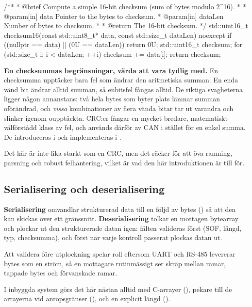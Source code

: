 \begin{cppcode}
/**
 * @brief Compute a simple 16-bit checksum (sum of bytes modulo 2^16).
 *
 * @param[in] data Pointer to the bytes to checksum.
 * @param[in] dataLen Number of bytes to checksum.
 *
 * @return The 16-bit checksum.
 */
std::uint16_t checksum16(const std::uint8_t* data, const std::size_t dataLen) noexcept
{
    if ((nullptr == data) || (0U == dataLen)) { return 0U; }
    std::uint16_t checksum{};
    for (std::size_t i{}; i < dataLen; ++i) { checksum += data[i]; }
    return checksum;
}
\end{cppcode}

\begin{warning}
\textbf{En checksummas begränsningar, värda att vara tydlig med.} En checksumma upptäcker bara fel
som ändrar den aritmetiska summan. En enda vänd bit ändrar alltid summan, så enbitsfel fångas
alltid. De riktiga svagheterna ligger någon annanstans: två hela bytes som byter plats lämnar summan
oförändrad, och \emph{vissa} kombinationer av flera vända bitar tar ut varandra och slinker igenom
oupptäckta. CRC:er fångar en mycket bredare, matematiskt välförstådd klass av fel, och används därför
av CAN i stället för en enkel summa. De introduceras i  och
implementeras i .
\end{warning}

Det här är inte lika starkt som en CRC, men det räcker för att öva ramning, parsning och robust
felhantering, vilket är vad den här introduktionen är till för.

\subsection*{Serialisering och deserialisering}
\textbf{Serialisering} omvandlar strukturerad data till en följd av bytes () så
att den kan skickas över ett gränssnitt. \textbf{Deserialisering} tolkar en mottagen bytearray och
plockar ut den strukturerade datan igen: fälten valideras först (SOF, längd, typ, checksumma), och
först när varje kontroll passerat plockas datan ut.

Att validera före utplockning spelar roll eftersom UART och RS-485 levererar bytes som en ström, så
en mottagare rutinmässigt ser skräp mellan ramar, tappade bytes och förvanskade ramar.

I inbyggda system görs det här nästan alltid med C-arrayer (),
pekare till de arrayerna vid anropsgränser (), och en explicit längd
().

